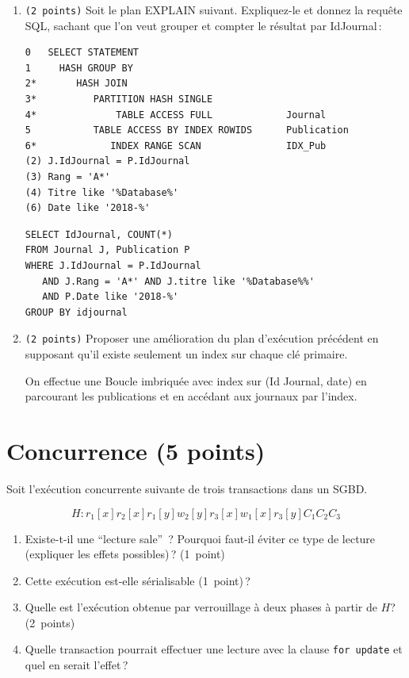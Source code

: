 \begin{enumerate}
	\item \texttt{(2~points)} Soit le plan EXPLAIN suivant.
  Expliquez-le et donnez la requête SQL, sachant que l'on veut grouper et compter le résultat par IdJournal\,:
\begin{verbatim}
0   SELECT STATEMENT
1     HASH GROUP BY
2*       HASH JOIN
3*          PARTITION HASH SINGLE
4*              TABLE ACCESS FULL             Journal
5           TABLE ACCESS BY INDEX ROWIDS      Publication
6*             INDEX RANGE SCAN               IDX_Pub
(2) J.IdJournal = P.IdJournal
(3) Rang = 'A*'
(4) Titre like '%Database%'
(6) Date like '2018-%'
\end{verbatim}

\begin{solution}
\begin{verbatim}
SELECT IdJournal, COUNT(*)
FROM Journal J, Publication P
WHERE J.IdJournal = P.IdJournal
   AND J.Rang = 'A*' AND J.titre like '%Database%%'
   AND P.Date like '2018-%'
GROUP BY idjournal
\end{verbatim}
\end{solution}

	\item \texttt{(2~points)} Proposer une amélioration
  du plan d'exécution précédent en supposant qu'il existe seulement un index
  sur chaque clé primaire.
\begin{solution}
On effectue une  Boucle imbriquée avec index  sur (Id Journal, date)
en parcourant les publications et en accédant aux journaux
par l'index.
\end{solution}
\end{enumerate}


\section{Concurrence (5 points)}

Soit l'ex\'ecution concurrente suivante de trois transactions dans un SGBD.

$$H: r_1[x] r_2[x] r_1[y] w_2[y] r_3[x] w_1[x] r_3[y] C_1 C_2 C_3$$

\begin{enumerate}
   \item Existe-t-il une ``lecture sale''~? Pourquoi faut-il \'eviter
   ce type de lecture (expliquer les effets possibles)\,? (1~point)

    \item Cette exécution est-elle sérialisable (1~point)\,?

     \item Quelle est l'ex\'ecution obtenue par verrouillage \`a deux phases
   \`a partir de $H$?  (2~points)

   \item Quelle transaction pourrait effectuer une lecture avec la clause
     \texttt{for update} et quel en serait l'effet\,?
\end{enumerate}

